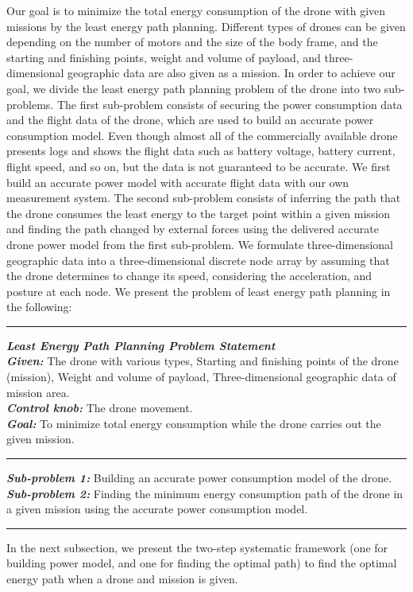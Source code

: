 \documentclass[journal]{./template/IEEEtran}
\begin{document}
Our goal is to minimize the total energy consumption of the drone with given missions by the least energy path planning.
Different types of drones can be given depending on the number of motors and the size of the body frame, and the starting and finishing points, weight and volume of payload, and three-dimensional geographic data are also given as a mission.
In order to achieve our goal, we divide the least energy path planning problem of the drone into two sub-problems.
The first sub-problem consists of securing the power consumption data and the flight data of the drone, which are used to build an accurate power consumption model.
Even though almost all of the commercially available drone presents logs and shows the flight data such as battery voltage, battery current, flight speed, and so on, but the data is not guaranteed to be accurate. We first build an accurate power model with accurate flight data with our own measurement system.
The second sub-problem consists of inferring the path that the drone consumes the least energy to the target point within a given mission and finding the path changed by external forces using the delivered accurate drone power model from the first sub-problem. 
We formulate three-dimensional geographic data into a three-dimensional discrete node array by assuming that the drone determines to change its speed, considering the acceleration, and posture at each node.
We present the problem of least energy path planning in the following:

\vspace{5pt}
\hrule
\vspace{5pt}
\noindent\textit{\textbf{Least Energy Path Planning Problem Statement}}
~\\
\noindent\textit{\textbf{Given:}} The drone with various types, Starting and finishing points of the drone (mission), Weight and volume of payload, Three-dimensional geographic data of mission area.
~\\
\noindent\textit{\textbf{Control knob:}} The drone movement.
~\\
\noindent\textit{\textbf{Goal:}} To minimize total energy consumption while the drone carries out the given mission.
\vspace{5pt}
\hrule
\vspace{5pt}
\noindent\textit{\textbf{Sub-problem 1:}} Building an accurate power consumption model of the drone.
~\\
\noindent\textit{\textbf{Sub-problem 2:}} Finding the minimum energy consumption path of the drone in a given mission using the accurate power consumption model.
\vspace{5pt}
\hrule
\vspace{5pt}
\noindent
In the next subsection, we present the two-step systematic framework (one for building power model, and one for finding the optimal path) to find the optimal energy path when a drone and mission is given.
\end{document}
